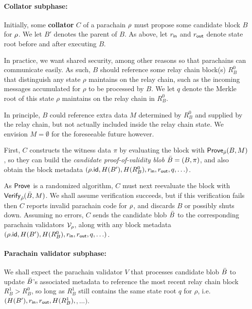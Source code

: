 \paragraph{Collator subphase:} 

Initially, some {\bf collator} $C$ of a parachain $\rho$ must propose some candidate block $B$ for $\rho$.  We let $B'$ denotes the parent of $B$.  As above, let $r_{\mathsf{in}}$ and $r_{\mathsf{out}}$ denote state root before and after executing $B$.  

In practice, we want shared security, among other reasons so that parachains can communicate easily.  As such, $B$ should reference some relay chain block(s) $R^0_B$ that distinguish any state $\rho$ maintains on the relay chain, such as the incoming messages accumulated for $\rho$ to be processed by $B$.  We let $q$ denote the Merkle root of this state $\rho$ maintains on the relay chain in $R^0_B$.  

In principle, $B$ could reference extra data $M$ determined by $R^0_B$ and supplied by the relay chain, but not actually included inside the relay chain state.  We envision $M = \emptyset$ for the foreseeable future however. 

First, $C$ constructs the witness data $\pi$ by evaluating the block with $\mathsf{Prove}_{\hat{\rho}}(B,M)$, so they can build the {\em candidate proof-of-validity blob} $\bar{B} = (B,\pi)$, and also obtain the block metadata $(\rho.\mathsf{id},H(B'),H(R^0_B),r_{\mathsf{in}},r_{\mathsf{out}},q,\ldots)$.

As $\mathsf{Prove}$ is a randomized algorithm, $C$ must next reevaluate the block with $\mathsf{Verify}_{\hat{\rho}}(\bar{B},M)$.  We shall assume verification succeeds, but if this verification fails then $C$ reports invalid parachain code for $\rho$, and discards $B$ or possibly shuts down.  Assuming no errors, $C$ sends the candidate blob $\bar{B}$ to the corresponding parachain validators $\mathcal{V}_{\rho}$, along with any block metadata $(\rho.\mathsf{id},H(B'),H(R^0_B),r_{\mathsf{in}},r_{\mathsf{out}},q,\ldots)$. 

\smallskip
\paragraph{Parachain validator subphase:}

We shall expect the parachain validator $V$ that processes candidate blob $\bar{B}$ to update $\bar{B}$'s associated metadata to reference the most recent relay chain block $R^1_B > R^0_B$, so long as $R^1_B$ still contains the same state root $q$ for $\rho$,
i.e.\ $(H(B'),r_{\mathsf{in}},r_{\mathsf{out}},H(R^1_B),$$,\ldots)$.

